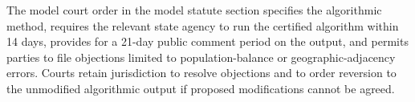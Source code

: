 The model court order in the model statute section specifies the algorithmic method, requires the relevant state agency to run the certified algorithm within 14 days, provides for a 21-day public comment period on the output, and permits parties to file objections limited to population-balance or geographic-adjacency errors. Courts retain jurisdiction to resolve objections and to order reversion to the unmodified algorithmic output if proposed modifications cannot be agreed.
